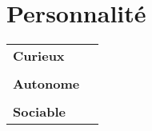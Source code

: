 \documentclass[a4paper, 12pt]{article}
\begin{document}
\begin{minipage}[t]{0.35\textwidth}
		\section*{\textcolor{sectioncolor}{Personnalité}}
		\begin{tabular}{ m{} m{} }
			\textbf{Curieux} & \\ & \\
			\textbf{Autonome} & \\ & \\
			\textbf{Sociable} &
		\end{tabular}
		
	\end{minipage}
	
\end{document}
